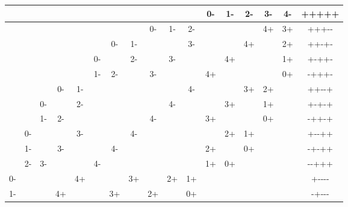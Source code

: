 \begin{table}[ht]
\centering
\begin{adjustbox}{width=1\textwidth}
	\small
\begin{tabular}{|c|c|c|c|c|c|c|c|c|c|c|c|c|c|c|c|c|}
\hline
      &       &       &       &       &       &       &       &       &       &       & 0-    & 1-    & 2-    & 3-    & 4-    & +++++ \\ \hline
	  &       &       &       &       &       &       &       & 0-    & 1-    & 2-    &       &       &       & 4+    & 3+    & +++-{}- \\ \hline
      &       &       &       &       &       & 0-    & 1-    &       &       & 3-    &       &       & 4+    &       & 2+    & ++-+- \\ \hline
      &       &       &       &       & 0-    &       & 2-    &       & 3-    &       &       & 4+    &       &       & 1+    & +-++- \\ \hline
      &       &       &       &       & 1-    & 2-    &       & 3-    &       &       & 4+    &       &       &       & 0+    & -+++- \\ \hline
	  &       &       & 0-    & 1-    &       &       &       &       &       & 4-    &       &       & 3+    & 2+    &       & ++-{}-+ \\ \hline
      &       & 0-    &       & 2-    &       &       &       &       & 4-    &       &       & 3+    &       & 1+    &       & +-+-+ \\ \hline
      &       & 1-    & 2-    &       &       &       &       & 4-    &       &       & 3+    &       &       & 0+    &       & -++-+ \\ \hline
	  & 0-    &       &       & 3-    &       &       & 4-    &       &       &       &       & 2+    & 1+    &       &       & +-{}-++ \\ \hline
      & 1-    &       & 3-    &       &       & 4-    &       &       &       &       & 2+    &       & 0+    &       &       & -+-++ \\ \hline
	  & 2-    & 3-    &       &       & 4-    &       &       &       &       &       & 1+    & 0+    &       &       &       & -{}-+++ \\ \hline
	0-    &       &       &       & 4+    &       &       & 3+    &       & 2+    & 1+    &       &       &       &       &       & +-{}-{}-{}- \\ \hline
	1-    &       &       & 4+    &       &       & 3+    &       & 2+    &       & 0+    &       &       &       &       &       & -+-{}-{}- \\ \hline

\end{tabular}
\end{adjustbox}
\end{table}
